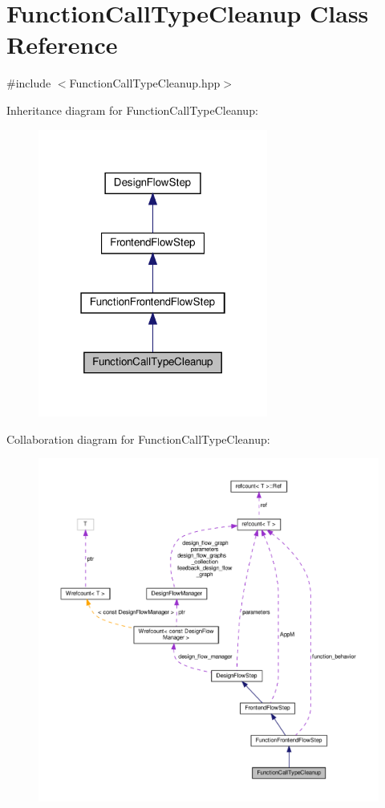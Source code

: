 \hypertarget{classFunctionCallTypeCleanup}{}\section{Function\+Call\+Type\+Cleanup Class Reference}
\label{classFunctionCallTypeCleanup}


{\ttfamily \#include $<$Function\+Call\+Type\+Cleanup.\+hpp$>$}



Inheritance diagram for Function\+Call\+Type\+Cleanup\+:
\nopagebreak
\begin{figure}[H]
\begin{center}
\leavevmode
\includegraphics[width=214pt]{dd/d7c/classFunctionCallTypeCleanup__inherit__graph}
\end{center}
\end{figure}


Collaboration diagram for Function\+Call\+Type\+Cleanup\+:
\nopagebreak
\begin{figure}[H]
\begin{center}
\leavevmode
\includegraphics[width=350pt]{db/d12/classFunctionCallTypeCleanup__coll__graph}
\end{center}
\end{figure}
